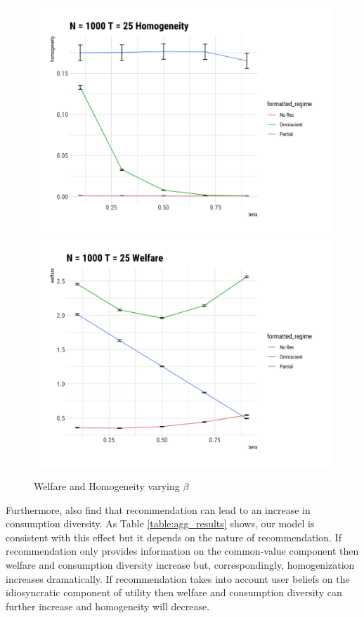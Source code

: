 \documentclass[sigconf]{acmart}
\begin{document}
\begin{figure}
\includegraphics[scale=0.05]{figures/beta_homogeneity_t_25}
\includegraphics[scale=0.05]{figures/beta_welfare_t_25}
\caption{Welfare and Homogeneity varying $\beta$}
\label{fig:beta_vary}
\end{figure}
\par
Furthermore, \cite{nguyen2014exploring} also find that recommendation can lead to an increase in consumption diversity. As Table \ref{table:agg_results} shows, our model is consistent with this effect but it depends on the nature of recommendation. If recommendation only provides information on the common-value component then welfare and consumption diversity increase but, correspondingly, homogenization increases dramatically. If recommendation takes into account user beliefs on the idiosyncratic  component of utility then welfare and consumption diversity can further increase and homogeneity will decrease.
\end{document}
